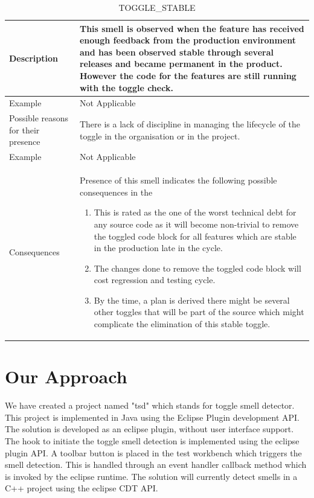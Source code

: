 \documentclass[conference]{IEEEtran}
\begin{document}
\begin{table}[ht]
\caption{TOGGLE\_STABLE}
\centering
\begin{tabular}{|p{1.3cm}|p{7cm}|}
 \hline\hline
 Description & This smell is observed when the feature has received enough feedback from the production environment and has been observed stable through several releases and became permanent in the product. However the code for the features are still running with the toggle check.  \\ \hline

Example & Not Applicable \\ \hline
Possible reasons for their presence & There is a lack of discipline in managing the lifecycle of the toggle in the organisation or in the project. \\ \hline
Example & Not Applicable \\ \hline
Consequences & Presence of this smell indicates the following possible consequences in the
\begin{enumerate}
	\item This is rated as the one of the worst technical debt for any source code as it will become non-trivial to remove the toggled code block for all features which are stable in the production late in the cycle.
\item The changes done to remove the toggled code block will cost regression and testing cycle.
\item By the time, a plan is derived there might be several other toggles that will be part of the source which might complicate the elimination of this stable toggle. 
\end{enumerate}
\\ \hline

\end{tabular}
\label{table:chrome-dir-data}
\end{table}

\section{Our Approach}
\label{Methodology and Implimentation}
We have created a project named "tsd" which stands for toggle smell detector. This project is implemented in Java using the Eclipse Plugin development API. The solution is developed as an eclipse plugin, without user interface support. The hook to initiate the toggle smell detection is implemented using the eclipse plugin API. A toolbar button is placed in the test workbench which triggers the smell detection. This is handled through an event handler callback method which is invoked by the eclipse runtime. The solution will currently detect smells in a C++ project using the eclipse CDT API.\\
\end{document}
